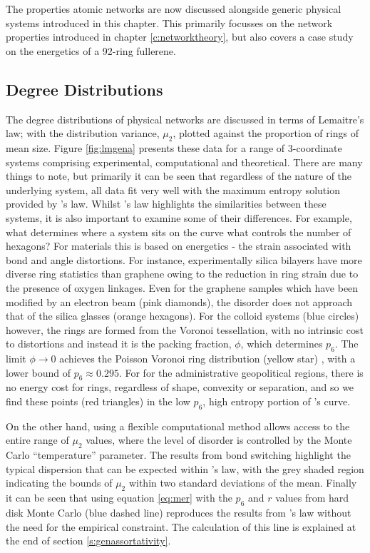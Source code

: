 The properties \td{} atomic networks are now discussed alongside generic physical systems introduced in this chapter.
This primarily focusses on the network properties introduced in chapter \ref{c:networktheory}, but also covers a case study on the energetics of a 92\--ring fullerene.

\subsection{Degree Distributions}

The degree distributions of physical networks are discussed in terms of Lemaitre's law; with the distribution variance, $\mu_2$, plotted against the proportion of rings of mean size.
Figure \ref{fig:lmgena} presents these data for a range of 3\--coordinate systems comprising experimental, computational and theoretical.
There are many things to note, but primarily it can be seen that regardless of the nature of the underlying system, all data fit very well with the maximum entropy solution provided by \lm{}'s law.
Whilst \lm's law highlights the similarities between these systems, it is also important to examine some of their differences. For example, what determines where a system sits on the \lm{} curve \ie{} what controls the number of hexagons?
For materials this is based on energetics \-- the strain associated with bond and angle distortions. For instance, experimentally silica bilayers have more diverse ring statistics than graphene owing to the reduction in ring strain due to the presence of oxygen linkages\cite{Buchner2017}.
Even for the graphene samples which have been modified by an electron beam (pink diamonds), the disorder does not approach that of the silica glasses (orange hexagons).
For the colloid systems (blue circles) however, the rings are formed from the Voronoi tessellation, with no intrinsic cost to distortions and instead it is the packing fraction, $\phi$, which determines $p_6$.
The limit $\phi\rightarrow 0$ achieves the Poisson Voronoi ring distribution (yellow star) \cite{Tanemura2003}, with a lower bound of $p_6 \approx 0.295$.
For for the administrative geopolitical regions, there is no energy cost for rings, regardless of shape, convexity or separation, and so we find these points (red triangles) in the low $p_6$, high entropy portion of \lm's{} curve.

On the other hand, using a flexible computational method allows access to the entire range of $\mu_2$ values, where the level of disorder is controlled by the Monte Carlo ``temperature'' parameter.
The results from bond switching highlight the typical dispersion that can be expected within \lm's{} law, with the grey shaded region indicating the bounds of $\mu_2$ within two standard deviations of the mean.
Finally it can be seen that using equation \eqref{eq:mer} with the $p_6$ and $r$ values from hard disk Monte Carlo (blue dashed line) reproduces the results from \lm's{} law without the need for the empirical constraint.
The calculation of this line is explained at the end of section \ref{s:genassortativity}.

